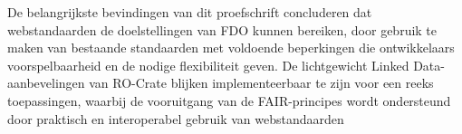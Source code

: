 De belangrijkste bevindingen van dit proefschrift concluderen dat webstandaarden de doelstellingen van FDO kunnen bereiken, door gebruik te maken van bestaande standaarden met voldoende beperkingen die ontwikkelaars voorspelbaarheid en de nodige flexibiliteit geven. De lichtgewicht Linked Data-aanbevelingen van RO-Crate blijken implementeerbaar te zijn voor een reeks toepassingen, waarbij de vooruitgang van de FAIR-principes wordt ondersteund door praktisch en interoperabel gebruik van webstandaarden
